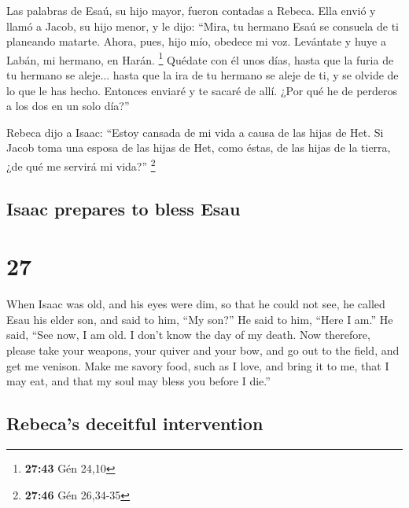 \begin{paracol}{2}
 Las palabras de Esaú, su hijo mayor, fueron contadas a
Rebeca. Ella envió y llamó a Jacob, su hijo menor, y le dijo: ``Mira, tu
hermano Esaú se consuela de ti planeando matarte.  Ahora,
pues, hijo mío, obedece mi voz. Levántate y huye a Labán, mi hermano, en
Harán. \footnote{\textbf{27:43} Gén 24,10}  Quédate con
él unos días, hasta que la furia de tu hermano se aleje...
 hasta que la ira de tu hermano se aleje de ti, y se
olvide de lo que le has hecho. Entonces enviaré y te sacaré de allí.
¿Por qué he de perderos a los dos en un solo día?''

 Rebeca dijo a Isaac: ``Estoy cansada de mi vida a causa
de las hijas de Het. Si Jacob toma una esposa de las hijas de Het, como
éstas, de las hijas de la tierra, ¿de qué me servirá mi vida?''
\footnote{\textbf{27:46} Gén 26,34-35}

\switchcolumn
\begin{otherlanguage}{english}

\hypertarget{isaac-prepares-to-bless-esau}{%
\subsection{Isaac prepares to bless
Esau}\label{isaac-prepares-to-bless-esau}}

\hypertarget{section-53}{%
\section{27}\label{section-53}}

 When Isaac was old, and his eyes were dim, so that he
could not see, he called Esau his elder son, and said to him, ``My
son?'' He said to him, ``Here I am.''  He said, ``See now,
I am old. I don't know the day of my death.  Now
therefore, please take your weapons, your quiver and your bow, and go
out to the field, and get me venison.  Make me savory
food, such as I love, and bring it to me, that I may eat, and that my
soul may bless you before I die.''

\hypertarget{rebecas-deceitful-intervention}{%
\subsection{Rebeca's deceitful
intervention}\label{rebecas-deceitful-intervention}}


\end{otherlanguage}
\end{paracol}
